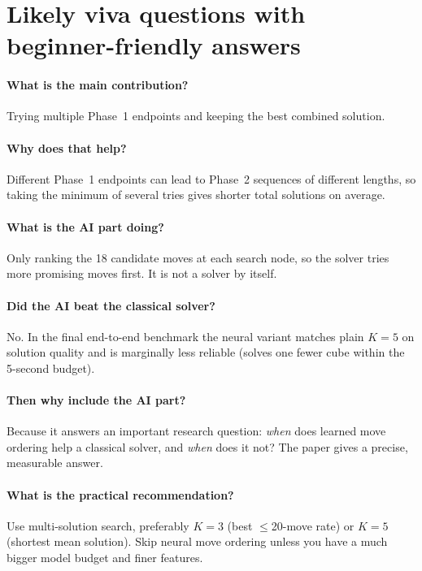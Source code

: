 \documentclass[11pt,a4paper]{article}
\begin{document}
\section{Likely viva questions with beginner-friendly answers}
\label{sec:viva}

\paragraph{What is the main contribution?}
Trying multiple Phase~1 endpoints and keeping the best combined
solution.

\paragraph{Why does that help?}
Different Phase~1 endpoints can lead to Phase~2 sequences of different
lengths, so taking the minimum of several tries gives shorter total
solutions on average.

\paragraph{What is the AI part doing?}
Only ranking the 18 candidate moves at each search node, so the solver
tries more promising moves first. It is not a solver by itself.

\paragraph{Did the AI beat the classical solver?}
No. In the final end-to-end benchmark the neural variant matches plain
$K=5$ on solution quality and is marginally less reliable (solves one
fewer cube within the 5-second budget).

\paragraph{Then why include the AI part?}
Because it answers an important research question: \emph{when} does
learned move ordering help a classical solver, and \emph{when} does it
not? The paper gives a precise, measurable answer.

\paragraph{What is the practical recommendation?}
Use multi-solution search, preferably $K=3$ (best $\leq$20-move rate)
or $K=5$ (shortest mean solution). Skip neural move ordering unless you
have a much bigger model budget and finer features.
\end{document}
